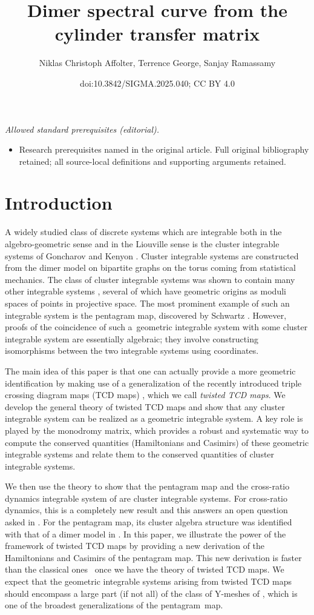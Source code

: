\documentclass[10pt,a4paper]{amsart}
\title{Dimer spectral curve from the cylinder transfer matrix}
\author{Niklas Christoph Affolter, Terrence George, Sanjay Ramassamy}
\date{doi:10.3842/SIGMA.2025.040; CC BY 4.0}
\numberwithin{equation}{section}
\begin{document}
\maketitle
\noindent\textit{Allowed standard prerequisites (editorial).}\begin{itemize}
\item Research prerequisites named in the original article. Full original bibliography retained; all source-local definitions and supporting arguments retained.
\end{itemize}\medskip
\section{Introduction}
	
A widely studied class of discrete systems which are integrable both in the algebro-geometric sense and in the Liouville sense is the cluster integrable systems of Goncharov and Kenyon \cite{GK13}. Cluster integrable systems are constructed from the dimer model on bipartite graphs on the torus coming from statistical mechanics. The class of cluster integrable systems was shown to contain many other integrable systems \cite{FM16}, several of which have geometric origins as moduli spaces of points in projective space. The most prominent example of such an integrable system is the pentagram map, discovered by Schwartz \cite{Schwartz1}. However, proofs of the coincidence of such a~geometric integrable system with some cluster integrable system are essentially algebraic; they involve constructing isomorphisms between the two integrable systems using coordinates.
	
	The main idea of this paper is that one can actually provide a more geometric identification by making use of a generalization of the recently introduced triple crossing diagram maps (TCD maps) \cite{AGPR,AGR}, which we call \textit{twisted TCD maps}. We develop the general theory of twisted TCD maps and show that any cluster integrable system can be realized as a geometric integrable system. A key role is played by the monodromy matrix, which provides a robust and systematic way to compute the conserved quantities (Hamiltonians and Casimirs) of these geometric integrable systems and relate them to the conserved quantities of cluster integrable systems.
	
	We then use the theory to show that the pentagram map and the cross-ratio dynamics integrable system of \cite{AFIT} are cluster integrable systems. For cross-ratio dynamics, this is a completely new result and this answers an open question asked in \cite{AFIT}. For the pentagram map, its cluster algebra structure was identified with that of a dimer model in \cite{AGPR}. In this paper, we illustrate the power of the framework of twisted TCD maps by providing a new derivation of the Hamiltonians and Casimirs of the pentagram map. This new derivation is faster than the classical ones~\mbox{\cite{OST1,Soloviev}} once we have the theory of twisted TCD maps. We expect that the geometric integrable systems arising from twisted TCD maps should encompass a large part (if not all) of the class of Y-meshes of \cite{GP}, which is one of the broadest generalizations of the pentagram~map.
	
\end{document}
